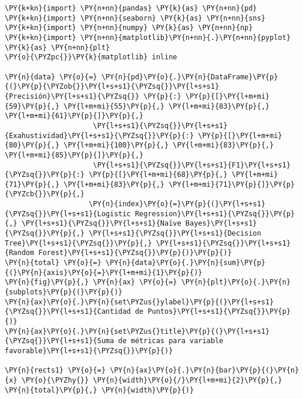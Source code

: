     \begin{tcolorbox}[breakable, size=fbox, boxrule=1pt, pad at break*=1mm,colback=cellbackground, colframe=cellborder]
\begin{Verbatim}[commandchars=\\\{\}]
\PY{k+kn}{import} \PY{n+nn}{pandas} \PY{k}{as} \PY{n+nn}{pd} 
\PY{k+kn}{import} \PY{n+nn}{seaborn} \PY{k}{as} \PY{n+nn}{sns} 
\PY{k+kn}{import} \PY{n+nn}{numpy} \PY{k}{as} \PY{n+nn}{np}
\PY{k+kn}{import} \PY{n+nn}{matplotlib}\PY{n+nn}{.}\PY{n+nn}{pyplot} \PY{k}{as} \PY{n+nn}{plt}
\PY{o}{\PYZpc{}}\PY{k}{matplotlib} inline

\PY{n}{data} \PY{o}{=} \PY{n}{pd}\PY{o}{.}\PY{n}{DataFrame}\PY{p}{(}\PY{p}{\PYZob{}}\PY{l+s+s1}{\PYZsq{}}\PY{l+s+s1}{Precisión}\PY{l+s+s1}{\PYZsq{}} \PY{p}{:} \PY{p}{[}\PY{l+m+mi}{59}\PY{p}{,} \PY{l+m+mi}{55}\PY{p}{,} \PY{l+m+mi}{83}\PY{p}{,} \PY{l+m+mi}{61}\PY{p}{]}\PY{p}{,}
                     \PY{l+s+s1}{\PYZsq{}}\PY{l+s+s1}{Exahustividad}\PY{l+s+s1}{\PYZsq{}}\PY{p}{:} \PY{p}{[}\PY{l+m+mi}{80}\PY{p}{,} \PY{l+m+mi}{100}\PY{p}{,} \PY{l+m+mi}{83}\PY{p}{,} \PY{l+m+mi}{85}\PY{p}{]}\PY{p}{,}
                     \PY{l+s+s1}{\PYZsq{}}\PY{l+s+s1}{F1}\PY{l+s+s1}{\PYZsq{}}\PY{p}{:} \PY{p}{[}\PY{l+m+mi}{68}\PY{p}{,} \PY{l+m+mi}{71}\PY{p}{,} \PY{l+m+mi}{83}\PY{p}{,} \PY{l+m+mi}{71}\PY{p}{]}\PY{p}{\PYZcb{}}\PY{p}{,}
                    \PY{n}{index}\PY{o}{=}\PY{p}{(}\PY{l+s+s1}{\PYZsq{}}\PY{l+s+s1}{Logistic Regression}\PY{l+s+s1}{\PYZsq{}}\PY{p}{,} \PY{l+s+s1}{\PYZsq{}}\PY{l+s+s1}{Naïve Bayes}\PY{l+s+s1}{\PYZsq{}}\PY{p}{,} \PY{l+s+s1}{\PYZsq{}}\PY{l+s+s1}{Decision Tree}\PY{l+s+s1}{\PYZsq{}}\PY{p}{,} \PY{l+s+s1}{\PYZsq{}}\PY{l+s+s1}{Random Forest}\PY{l+s+s1}{\PYZsq{}}\PY{p}{)}\PY{p}{)}
\PY{n}{total} \PY{o}{=} \PY{n}{data}\PY{o}{.}\PY{n}{sum}\PY{p}{(}\PY{n}{axis}\PY{o}{=}\PY{l+m+mi}{1}\PY{p}{)}
\PY{n}{fig}\PY{p}{,} \PY{n}{ax} \PY{o}{=} \PY{n}{plt}\PY{o}{.}\PY{n}{subplots}\PY{p}{(}\PY{p}{)}
\PY{n}{ax}\PY{o}{.}\PY{n}{set\PYZus{}ylabel}\PY{p}{(}\PY{l+s+s1}{\PYZsq{}}\PY{l+s+s1}{Cantidad de Puntos}\PY{l+s+s1}{\PYZsq{}}\PY{p}{)}
\PY{n}{ax}\PY{o}{.}\PY{n}{set\PYZus{}title}\PY{p}{(}\PY{l+s+s1}{\PYZsq{}}\PY{l+s+s1}{Suma de métricas para variable favorable}\PY{l+s+s1}{\PYZsq{}}\PY{p}{)}

\PY{n}{rects1} \PY{o}{=} \PY{n}{ax}\PY{o}{.}\PY{n}{bar}\PY{p}{(}\PY{n}{x} \PY{o}{\PYZhy{}} \PY{n}{width}\PY{o}{/}\PY{l+m+mi}{2}\PY{p}{,} \PY{n}{total}\PY{p}{,} \PY{n}{width}\PY{p}{)}


\end{Verbatim}
\end{tcolorbox}

